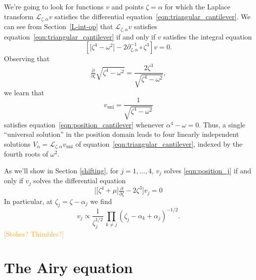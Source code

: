 \documentclass{article}
\newcommand{\fracderiv}[3]{\partial^{#1}_{#2, #3}}
\newcommand{\laplace}{\mathcal{L}}
\theoremstyle{definition}
\theoremstyle{plain}
\newenvironment{verify}{\color{ForestGreen}}{\color{black}}
\begin{document}
{\begin{verify}
\end{verify}
\color{black}
We're going to look for functions $v$ and points $\zeta = \alpha$ for which the Laplace transform $\laplace_{\zeta, \alpha} v$ satisfies the differential equation~\eqref{eqn:triangular_cantilever}. We can see from Section~\ref{L-int-op} that $\laplace_{\zeta, \alpha} v$ satisfies equation~\eqref{eqn:triangular_cantilever} if and only if $v$ satisfies the integral equation
\begin{equation}\label{eqn:position_cantilever}
    \left[ \big[ \zeta^4 - \omega^2 \big] - 2\fracderiv{-1}{\zeta}{\alpha} \circ \zeta^3 \right] v = 0.
\end{equation}
Observing that
\[ \tfrac{\partial}{\partial \zeta} \sqrt{\zeta^4 - \omega^2} = \frac{2\zeta^3}{\sqrt{\zeta^4 - \omega^2}}, \]
we learn that
\[ v_\text{uni} = \frac{1}{\sqrt{\zeta^4 - \omega^2}} \]
satisfies equation~\eqref{eqn:position_cantilever} whenever $\alpha^4 - \omega = 0$. Thus, a single ``universal solution'' in the position domain leads to four linearly independent solutions $V_\alpha = \laplace_{\zeta, \alpha} v_\text{uni}$ of equation~\eqref{eqn:triangular_cantilever}, indexed by the fourth roots of $\omega^2$.
\par\color{RoyalBlue}
As we'll show in Section \ref{shifting}, for $j=1,\ldots,4$, $v_j$ solves \eqref{eqn:position_j} if and only if $v_j$ solves the differential equation 
\begin{equation}
    \Big[\big[\zeta^4+\mu\big]\tfrac{\partial}{\partial\zeta}-2\zeta^3\Big]v_j = 0
\end{equation}
In particular, at $\zeta_j=\zeta-\alpha_j$ we find 
\[v_j \propto \frac{1}{\zeta_j^{1/2}}\, \prod_{k\neq j}(\zeta_j-\alpha_k+\alpha_j)^{-1/2}.\]
\color{black}
\textcolor{orange}{[Stokes? Thimbles?]}

\appendix

\section{The Airy equation}\label{airy-appendix}

}
\end{document}
